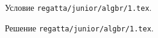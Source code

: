 \problem
Условие \texttt{regatta/junior/algbr/1.tex}.

\solution Решение \texttt{regatta/junior/algbr/1.tex}.
\endproblem

